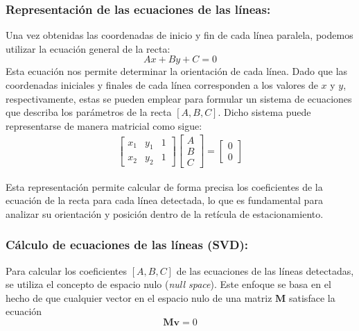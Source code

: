 \subsubsection{Representación de las ecuaciones de las líneas:}
\noindent
Una vez obtenidas las coordenadas de inicio y fin de cada línea paralela, podemos utilizar la ecuación general de la recta:
\begin{equation}
    Ax + By + C = 0
\end{equation}
Esta ecuación nos permite determinar la orientación de cada línea.
Dado que las coordenadas iniciales y finales de cada línea corresponden a los valores de $x$ y $y$, respectivamente,
estas se pueden emplear para formular un sistema de ecuaciones que describa los parámetros de la recta $[A, B, C]$.
Dicho sistema puede representarse de manera matricial como sigue:
\begin{equation}
    \begin{aligned}
        \left[\begin{array}{ccc}
                      x_1 & y_1 & 1 \\
                      x_2 & y_2 & 1
                  \end{array}\right]
        \begin{bmatrix}
            A \\
            B \\
            C
        \end{bmatrix}
        =
        \begin{bmatrix}
            0 \\
            0
        \end{bmatrix}
    \end{aligned}
\end{equation}

Esta representación permite calcular de forma precisa los coeficientes de la ecuación de la recta para cada línea detectada,
lo que es fundamental para analizar su orientación y posición dentro de la retícula de estacionamiento.

\subsubsection{Cálculo de ecuaciones de las líneas (SVD):}
\noindent
Para calcular los coeficientes $[A, B, C]$ de las ecuaciones de las líneas detectadas, se utiliza el concepto de espacio nulo (\emph{null space}).
Este enfoque se basa en el hecho de que cualquier vector en el espacio nulo de una matriz $\mathbf{M}$ satisface la ecuación
\begin{equation}
    \mathbf{Mv} = 0
\end{equation}

